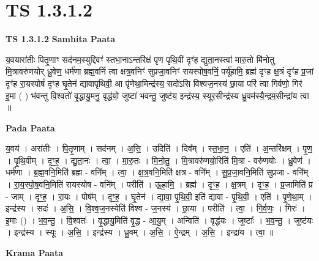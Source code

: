 \documentclass[17pt]{extarticle}
\begin{document}
\section{ TS 1.3.1.2 }

\textbf{TS 1.3.1.2 } \newline
\textbf{Samhita Paata} \newline

य॒वयारा॑तीः पितृ॒णाꣳ सद॑नम॒स्युद्दिवꣳ॑ स्तभा॒नाऽन्तरि॑क्षं पृण पृथि॒वीं दृꣳ॑ह द्युता॒नस्त्वा॑ मारु॒तो मि॑नोतु मि॒त्रावरु॑णयोर् ध्रु॒वेण॒ धर्म॑णा ब्रह्म॒वनिं॑ त्वा क्षत्र॒वनिꣳ॑ सुप्रजा॒वनिꣳ॑ रायस्पोष॒वनिं॒ पर्यू॑हामि॒ ब्रह्म॑ दृꣳह क्ष॒त्रं दृꣳ॑ह प्र॒जां दृꣳ॑ह रा॒यस्पोषं॑ दृꣳह घृ॒तेन॑ द्यावापृथिवी॒ आ पृ॑णेथा॒मिन्द्र॑स्य॒ सदो॑ऽसि विश्वज॒नस्य॑ छा॒या परि॑ त्वा गिर्वणो॒ गिर॑ इ॒मा ( ) भ॑वन्तु वि॒श्वतो॑ वृ॒द्धायु॒मनु॒ वृद्ध॑यो॒ जुष्टा॑ भवन्तु॒ जुष्ट॑य॒ इन्द्र॑स्य॒ स्यूर॒सीन्द्र॑स्य ध्रु॒वम॑स्यै॒न्द्रम॒सीन्द्रा॑य त्वा ॥ \newline

\textbf{Pada Paata} \newline

य॒वय॑ । अरा॑तीः । पि॒तृ॒णाम् । सद॑नम् । अ॒सि॒ । उदिति॑ । दिव᳚म् । स्त॒भा॒न॒ । एति॑ । अ॒न्तरि॑क्षम् । पृ॒ण॒ । पृ॒थि॒वीम् । दृꣳ॒॒ह॒ । द्यु॒ता॒नः । त्वा॒ । मा॒रु॒तः । मि॒नो॒तु॒ । मि॒॒त्रावरु॑णयो॒रिति॑ मि॒त्रा - वरु॑णयोः । ध्रु॒वेण॑ । धर्म॑णा । ब्र॒ह्म॒वनि॒मिति॑ ब्रह्म - वनि᳚म् । त्वा॒ । क्ष॒त्र॒वनि॒मिति॑ क्षत्र - वनि᳚म् । सु॒प्र॒जा॒वनि॒मिति॑ सुप्रजा - वनि᳚म् । रा॒य॒स्पो॒ष॒वनि॒मिति॑ रायस्योष - वनि᳚म् । परीति॑ । ऊ॒हा॒मि॒ । ब्रह्म॑ । दृꣳ॒॒ह॒ । क्ष॒त्रम् । दृꣳ॒॒ह॒ । प्र॒जामिति॑ प्र - जाम् । दृꣳ॒॒ह॒ । रा॒यः । पोष᳚म् । दृꣳ॒॒ह॒ । घृ॒तेन॑ । द्या॒वा॒ पृ॒थि॒वी॒ इति॑ द्यावा - पृ॒थि॒वी॒ । एति॑ । पृ॒णे॒था॒म् । इन्द्र॑स्य । सदः॑ । अ॒सि॒ । वि॒श्व॒ज॒नस्येति॑ विश्व - ज॒नस्य॑ । छा॒या । परीति॑ । त्वा॒ । गि॒र्व॒णः॒ । गिरः॑ । इ॒माः () । भ॒व॒न्तु॒ । वि॒श्वतः॑ । वृ॒द्धायु॒मिति॑ वृ॒द्ध - आ॒यु॒म् । अन्विति॑ । वृद्ध॑यः । जुष्टाः᳚ । भ॒व॒न्तु॒ । जुष्ट॑यः । इन्द्र॑स्य । स्यूः । अ॒सि॒ । इन्द्र॑स्य । ध्रु॒वम् । अ॒सि॒ । ऐ॒न्द्रम् । अ॒सि॒ । इन्द्रा॑य । त्वा॒ ॥  \newline


\textbf{Krama Paata} \newline
\end{document}
